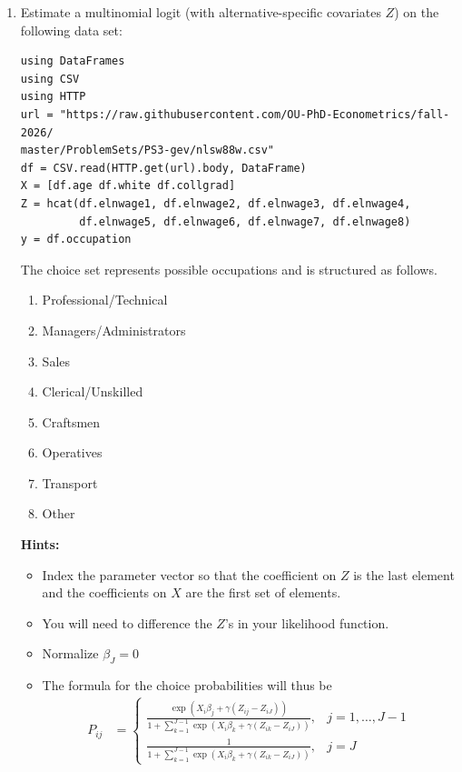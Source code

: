 \documentclass[12pt,english]{article}
\begin{document}
\begin{enumerate}
\item Estimate a multinomial logit (with alternative-specific covariates $Z$) on the following data set:

\begin{verbatim}
using DataFrames
using CSV
using HTTP
url = "https://raw.githubusercontent.com/OU-PhD-Econometrics/fall-2026/
master/ProblemSets/PS3-gev/nlsw88w.csv"
df = CSV.read(HTTP.get(url).body, DataFrame)
X = [df.age df.white df.collgrad]
Z = hcat(df.elnwage1, df.elnwage2, df.elnwage3, df.elnwage4, 
         df.elnwage5, df.elnwage6, df.elnwage7, df.elnwage8)
y = df.occupation
\end{verbatim}

The choice set represents possible occupations and is structured  as follows.

\begin{enumerate}
    \item[1] Professional/Technical 
    \item[2] Managers/Administrators
    \item[3] Sales                  
    \item[4] Clerical/Unskilled     
    \item[5] Craftsmen              
    \item[6] Operatives             
    \item[7] Transport              
    \item[8] Other                  
\end{enumerate}

\textbf{Hints:} 
\begin{itemize}
    \item Index the parameter vector so that the coefficient on $Z$ is the last element and the coefficients on $X$ are the first set of elements.
    \item You will need to difference the $Z$'s in your likelihood function. 
    \item Normalize $\beta_J = 0$
    \item The formula for the choice probabilities will thus be
    \begin{align*}
        P_{ij} &= \begin{cases} \frac{\exp\left(X_{i}\beta_j + \gamma(Z_{ij}-Z_{iJ})\right)}{1+\sum_{k=1}^{J-1}\exp\left(X_{i}\beta_k + \gamma(Z_{ik}-Z_{iJ})\right)} ,& j=1,\ldots,J-1\\
         \frac{1}{1+\sum_{k=1}^{J-1}\exp\left(X_{i}\beta_k + \gamma(Z_{ik}-Z_{iJ})\right)} ,& j=J
         \end{cases}
    \end{align*}
\end{itemize}


\end{enumerate}
\end{document}
